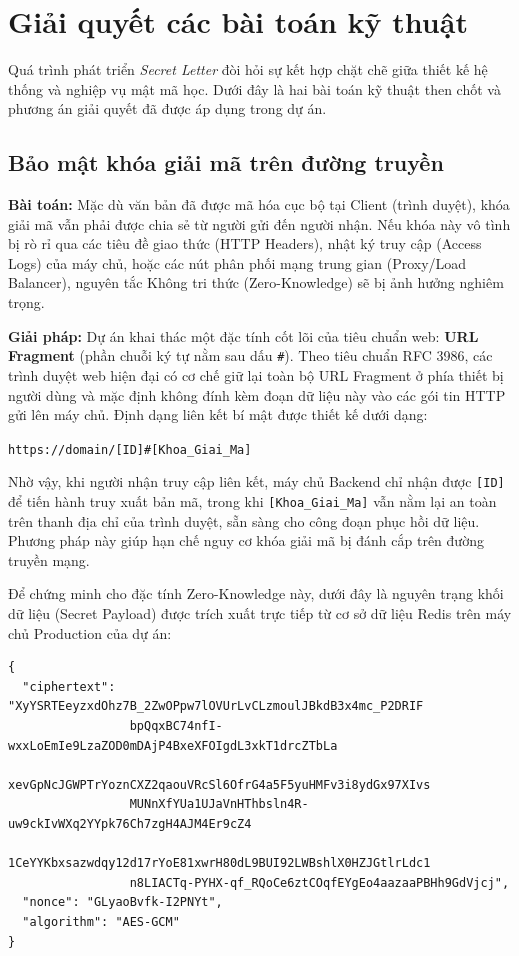 \section{Giải quyết các bài toán kỹ thuật}

Quá trình phát triển \textit{Secret Letter} đòi hỏi sự kết hợp chặt chẽ giữa thiết kế hệ thống và nghiệp vụ mật mã học. Dưới đây là hai bài toán kỹ thuật then chốt và phương án giải quyết đã được áp dụng trong dự án.

\subsection{Bảo mật khóa giải mã trên đường truyền}

\textbf{Bài toán:} Mặc dù văn bản đã được mã hóa cục bộ tại Client (trình duyệt), khóa giải mã vẫn phải được chia sẻ từ người gửi đến người nhận. Nếu khóa này vô tình bị rò rỉ qua các tiêu đề giao thức (HTTP Headers), nhật ký truy cập (Access Logs) của máy chủ, hoặc các nút phân phối mạng trung gian (Proxy/Load Balancer), nguyên tắc Không tri thức (Zero-Knowledge) sẽ bị ảnh hưởng nghiêm trọng.

\textbf{Giải pháp:} Dự án khai thác một đặc tính cốt lõi của tiêu chuẩn web: \textbf{URL Fragment} (phần chuỗi ký tự nằm sau dấu \texttt{\#}).
Theo tiêu chuẩn RFC 3986, các trình duyệt web hiện đại có cơ chế giữ lại toàn bộ URL Fragment ở phía thiết bị người dùng và mặc định không đính kèm đoạn dữ liệu này vào các gói tin HTTP gửi lên máy chủ. Định dạng liên kết bí mật được thiết kế dưới dạng:
\begin{center}
    \texttt{https://domain/[ID]\#[Khoa\_Giai\_Ma]}
\end{center}
Nhờ vậy, khi người nhận truy cập liên kết, máy chủ Backend chỉ nhận được \texttt{[ID]} để tiến hành truy xuất bản mã, trong khi \texttt{[Khoa\_Giai\_Ma]} vẫn nằm lại an toàn trên thanh địa chỉ của trình duyệt, sẵn sàng cho công đoạn phục hồi dữ liệu. Phương pháp này giúp hạn chế nguy cơ khóa giải mã bị đánh cắp trên đường truyền mạng.

Để chứng minh cho đặc tính Zero-Knowledge này, dưới đây là nguyên trạng khối dữ liệu (Secret Payload) được trích xuất trực tiếp từ cơ sở dữ liệu Redis trên máy chủ Production của dự án:

\renewcommand{\lstlistingname}{Đoạn mã}
\begin{lstlisting}[caption={Cấu trúc Secret Payload thực tế trích xuất từ Server Production}, breaklines=true, basicstyle={\small\ttfamily}]
{
  "ciphertext": "XyYSRTEeyzxdOhz7B_2ZwOPpw7lOVUrLvCLzmoulJBkdB3x4mc_P2DRIF
                 bpQqxBC74nfI-wxxLoEmIe9LzaZOD0mDAjP4BxeXFOIgdL3xkT1drcZTbLa
                 xevGpNcJGWPTrYoznCXZ2qaouVRcSl6OfrG4a5F5yuHMFv3i8ydGx97XIvs
                 MUNnXfYUa1UJaVnHThbsln4R-uw9ckIvWXq2YYpk76Ch7zgH4AJM4Er9cZ4
                 1CeYYKbxsazwdqy12d17rYoE81xwrH80dL9BUI92LWBshlX0HZJGtlrLdc1
                 n8LIACTq-PYHX-qf_RQoCe6ztCOqfEYgEo4aazaaPBHh9GdVjcj",
  "nonce": "GLyaoBvfk-I2PNYt",
  "algorithm": "AES-GCM"
}
\end{lstlisting}

